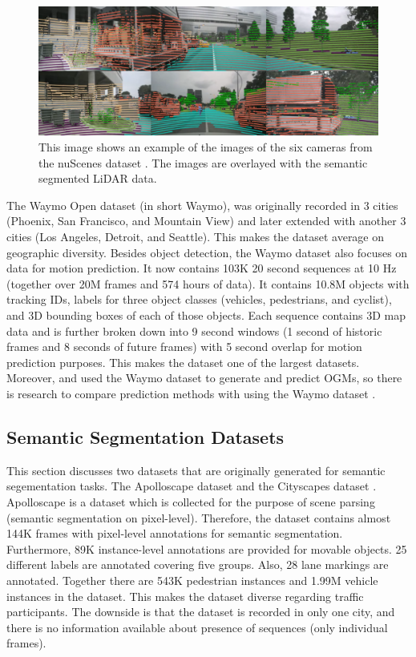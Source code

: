 \begin{figure}[h!]
	\centering
	\includegraphics[width=0.6\linewidth]{Figures/Datasets/NuScenes_Dataset}
	\caption{This image shows an example of the images of the six cameras from the nuScenes dataset \cite{caesar2020nuscenes}. The images are overlayed with the semantic segmented LiDAR data.}  
	\label{fig:dat_nuscenes}
\end{figure}

The Waymo Open dataset \cite{sun2020scalability} (in short Waymo), was originally recorded in 3 cities (Phoenix, San Francisco, and Mountain View) and later extended with another 3 cities (Los Angeles, Detroit, and Seattle). This makes the dataset average on geographic diversity. Besides object detection, the Waymo dataset \cite{sun2020scalability} also focuses on data for motion prediction. It now contains 103K 20 second sequences at 10 Hz (together over 20M frames and 574 hours of data). It contains 10.8M objects with tracking IDs, labels for three object classes (vehicles, pedestrians, and cyclist), and 3D bounding boxes of each of those objects. Each sequence contains 3D map data and is further broken down into 9 second windows (1 second of historic frames and 8 seconds of future frames) with 5 second overlap for motion prediction purposes. This makes the dataset one of the largest datasets. Moreover, \cite{lange2020attention} and \cite{toyungyernsub2020double} used the Waymo dataset to generate and predict \glspl{OGM}, so there is research to compare prediction methods with using the Waymo dataset \cite{sun2020scalability}.


\subsection{Semantic Segmentation Datasets} \label{subsec:data_sem_seg}
This section discusses two datasets that are originally generated for semantic segementation tasks. The Apolloscape dataset \cite{huang2019apolloscape}  and the Cityscapes dataset \cite{cordts2016cityscapes}. \\

Apolloscape \cite{huang2019apolloscape} is a dataset which is collected for the purpose of scene parsing (semantic segmentation on pixel-level). Therefore, the dataset contains almost 144K frames with pixel-level annotations for semantic segmentation. Furthermore, 89K instance-level annotations are provided for movable objects. 25 different labels are annotated covering five groups. Also, 28 lane markings are annotated. Together there are 543K pedestrian instances and 1.99M vehicle instances in the dataset. This makes the dataset diverse regarding traffic participants. The downside is that the dataset is recorded in only one city, and there is no information available about presence of sequences (only individual frames). \\

